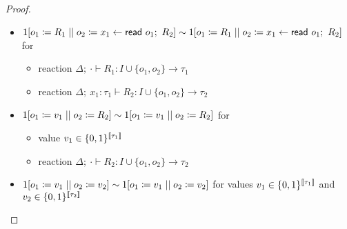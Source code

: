 \begin{proof}
\begin{itemize}
\begin{itemize}
\begin{itemize}
\end{itemize}
\item $1[\Par{\assign{o_1}{R_1}}{\assign{o_2}{x_1 \leftarrow \read{o_1}; \ R_2}}] \sim 1[\Par{\assign{o_1}{R_1}}{\assign{o_2}{x_1 \leftarrow \read{o_1}; \ R_2}}]$ for
\begin{itemize}
\item reaction $\Delta; \ \cdot \vdash R_1 : I \cup \{o_1,o_2\} \to \tau_1$
\item reaction $\Delta; \ x_1 : \tau_1 \vdash R_2 : I \cup \{o_1,o_2\} \to \tau_2$
\end{itemize}
\item $1[o_1 \coloneqq v_1 \; || \; o_2 \coloneqq R_2] \sim 1[o_1 \coloneqq v_1 \; || \; o_2 \coloneqq R_2]$ for
\begin{itemize}
\item value $v_1 \in \{0,1\}^{\llbracket \tau_1 \rrbracket}$
\item reaction $\Delta; \ \cdot \vdash R_2 : I \cup \{o_1,o_2\} \to \tau_2$
\end{itemize}
\item $1[o_1 \coloneqq v_1 \; || \; o_2 \coloneqq v_2] \sim 1[o_1 \coloneqq v_1 \; || \; o_2 \coloneqq v_2]$ for values $v_1 \in \{0,1\}^{\llbracket \tau_1 \rrbracket}$ and $v_2 \in \{0,1\}^{\llbracket \tau_2 \rrbracket}$
\end{itemize}



\end{itemize}
\end{proof}
